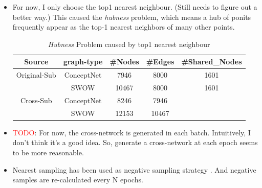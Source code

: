 \begin{enumerate}
\begin{itemize}
             \item For now, I only choose the top1 nearest neighbour. (Still needs to figure out a better way.) This caused the \textit{hubness} problem, which means a hub of ponits frequently appear as the top-1 nearest neighbors of many other points. 
                \begin{table}[!ht]
                    \centering
                    \begin{tabular}{c|cccc}
                    \hline
                         Source&graph-type & \#Nodes & \#Edges & \#Shared\_Nodes \\  \hline
                         Original-Sub& ConceptNet &  7946 & 8000 & 1601 \\
                         & SWOW & 10467 & 8000 & 1601 \\
                         \hline
                         Cross-Sub & ConceptNet & 8246 & 7946&  \\
                            & SWOW & 12153 & 10467 & \\
                         \hline
                    \end{tabular}
                    \caption{\textit{Hubness} Problem caused by top1 nearest neighbour}
                    \label{tab:my_label}
                \end{table}
            \item  \textcolor{red}{TODO}: For now, the cross-network is generated in each batch. Intuitively, I don't think it's a good idea. So, generate a cross-network at each epoch seems to be more reasonable. 
            \item Nearest sampling has been used as negative sampling strategy \citep{sun-etal-2018-BootEa, cao-etal-2019-multi}. And negative samples are re-calculated every N epochs. 
         \end{itemize}
        

\end{enumerate}
